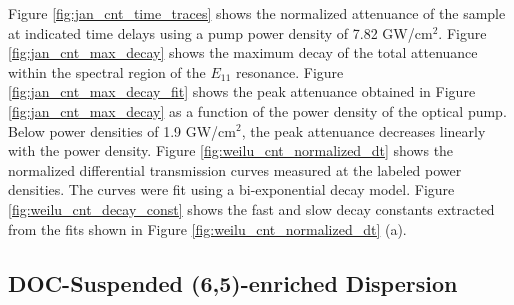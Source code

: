 Figure \ref{fig:jan_cnt_time_traces} shows the normalized attenuance of the sample at indicated time delays using a pump power density of 7.82 GW/cm$^2$. Figure \ref{fig:jan_cnt_max_decay} shows the maximum decay of the total attenuance within the spectral region of the $E_{11}$ resonance. Figure \ref{fig:jan_cnt_max_decay_fit} shows the peak attenuance obtained in Figure \ref{fig:jan_cnt_max_decay} as a function of the power density of the optical pump. Below power densities of 1.9 GW/cm$^2$, the peak attenuance decreases linearly with the power density. Figure \ref{fig:weilu_cnt_normalized_dt} shows the normalized differential transmission curves measured at the labeled power densities. The curves were fit using a bi-exponential decay model. Figure \ref{fig:weilu_cnt_decay_const} shows the fast and slow decay constants extracted from the fits shown in Figure \ref{fig:weilu_cnt_normalized_dt} (a).

\subsection{DOC-Suspended (6,5)-enriched Dispersion}



